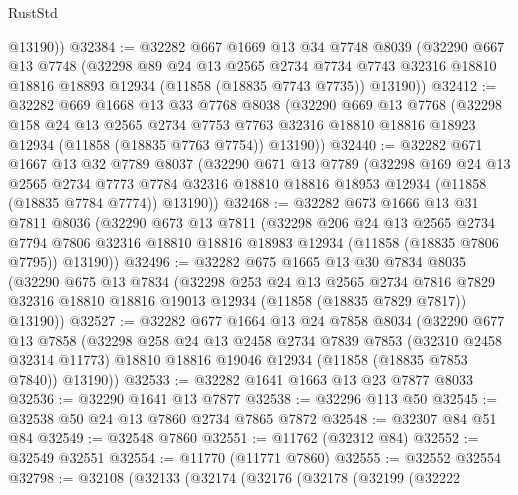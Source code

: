 \begin{lexlean}{RustStd}
\begin{coremodule}
        @13190))
@32384 := @32282
    @667
    @1669
    @13
    @34
    @7748
    @8039
    (@32290
      @667
      @13
      @7748
      (@32298
        @89
        @24
        @13
        @2565
        @2734
        @7734
        @7743
        @32316
        @18810
        @18816
        @18893
        @12934
        (@11858 (@18835 @7743 @7735))
        @13190))
@32412 := @32282
    @669
    @1668
    @13
    @33
    @7768
    @8038
    (@32290
      @669
      @13
      @7768
      (@32298
        @158
        @24
        @13
        @2565
        @2734
        @7753
        @7763
        @32316
        @18810
        @18816
        @18923
        @12934
        (@11858 (@18835 @7763 @7754))
        @13190))
@32440 := @32282
    @671
    @1667
    @13
    @32
    @7789
    @8037
    (@32290
      @671
      @13
      @7789
      (@32298
        @169
        @24
        @13
        @2565
        @2734
        @7773
        @7784
        @32316
        @18810
        @18816
        @18953
        @12934
        (@11858 (@18835 @7784 @7774))
        @13190))
@32468 := @32282
    @673
    @1666
    @13
    @31
    @7811
    @8036
    (@32290
      @673
      @13
      @7811
      (@32298
        @206
        @24
        @13
        @2565
        @2734
        @7794
        @7806
        @32316
        @18810
        @18816
        @18983
        @12934
        (@11858 (@18835 @7806 @7795))
        @13190))
@32496 := @32282
    @675
    @1665
    @13
    @30
    @7834
    @8035
    (@32290
      @675
      @13
      @7834
      (@32298
        @253
        @24
        @13
        @2565
        @2734
        @7816
        @7829
        @32316
        @18810
        @18816
        @19013
        @12934
        (@11858 (@18835 @7829 @7817))
        @13190))
@32527 := @32282
    @677
    @1664
    @13
    @24
    @7858
    @8034
    (@32290
      @677
      @13
      @7858
      (@32298
        @258
        @24
        @13
        @2458
        @2734
        @7839
        @7853
        (@32310 @2458 @32314 @11773)
        @18810
        @18816
        @19046
        @12934
        (@11858 (@18835 @7853 @7840))
        @13190))
@32533 := @32282 @1641 @1663 @13 @23 @7877 @8033
@32536 := @32290 @1641 @13 @7877
@32538 := @32296 @113 @50
@32545 := @32538 @50 @24 @13 @7860 @2734 @7865 @7872
@32548 := @32307 @84 @51 @84
@32549 := @32548 @7860
@32551 := @11762 (@32312 @84)
@32552 := @32549 @32551
@32554 := @11770 (@11771 @7860)
@32555 := @32552 @32554
@32798 := @32108
    (@32133
      (@32174
        (@32176
          (@32178
            (@32199
              (@32222

\end{coremodule}
\end{lexlean}
